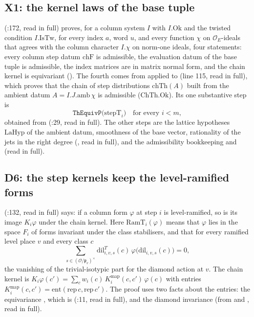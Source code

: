 \documentclass[11pt]{article}
\newcommand{\OEr}{\mathcal O_E}
\theoremstyle{definition}
\theoremstyle{remark}
\begin{document}
\subsection{X1: the kernel laws of the base tuple}
 (:172, read in full) proves, for a column system $I$ with $I.\mathrm{Ok}$ and the twisted condition $I.\mathrm{IsTw}$, for every index $a$, word $u$, and every function $\chi$ on $\OEr$-ideals that agrees with the column character $I.\chi$ on norm-one ideals, four statements: every column step datum $\mathrm{chF}$ is admissible, the evaluation datum of the base tuple is admissible, the index matrices are in matrix normal form, and the chain kernel is equivariant (). The fourth comes from  applied to  (line 115, read in full), which proves that the chain of step distributions $\mathrm{chTh}(A)$ built from the ambient datum $A = I.J.\mathrm{amb}\,\chi$ is admissible ($\mathrm{ChTh.Ok}$). Its one substantive step is
\[
\texttt{ThEquivP}\bigl(\mathrm{stepT}_i\bigr)\quad\text{for every } i<m,
\]
obtained from  (:29, read in full). The other steps are the lattice hypotheses $\mathrm{LaHyp}$ of the ambient datum, smoothness of the base vector, rationality of the jets in the right degree (, read in full), and the admissibility bookkeeping  and  (read in full).

\subsection{D6: the step kernels keep the level-ramified forms}
 (:132, read in full) says: if a column form $\varphi$ at step $i$ is level-ramified, so is its image $K_i\varphi$ under the chain kernel. Here $\mathrm{RamT}_i(\varphi)$ means that $\varphi$ lies in the space $F_i$ of forms invariant under the class stabilisers, and that for every ramified level place $v$ and every class $c$
\[
\sum_{s\in(\mathcal O/\mathfrak p_v)^\times}\mathrm{dil}^T_{i,v,s}(c)\,\varphi\bigl(\mathrm{dil}_{i,v,s}(c)\bigr)=0,
\]
the vanishing of the trivial-isotypic part for the diamond action at $v$. The chain kernel is $K_i\varphi(c')=\sum_c w_i(c)\,K^{\mathrm{map}}_i(c,c')\,\varphi(c)$ with entries $K^{\mathrm{map}}_i(c,c')=\mathrm{ent}(\mathrm{rep}\,c,\mathrm{rep}\,c')$. The proof uses two facts about the entries: the equivariance , which is  (:11, read in full), and the diamond invariance  (from  and , read in full).
\end{document}
